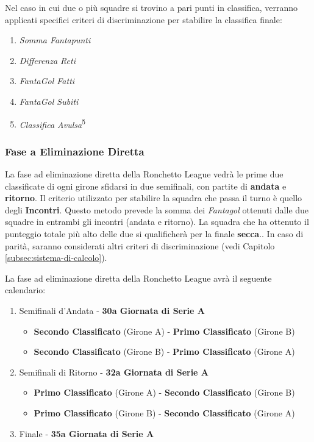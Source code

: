 \documentclass[12pt]{article}
\begin{document}
Nel caso in cui due o più squadre si trovino a pari punti in classifica, verranno applicati specifici criteri di discriminazione per stabilire la classifica finale:

\begin{enumerate}
    \item \textit{Somma Fantapunti}
    \item \textit{Differenza Reti}
    \item \textit{FantaGol Fatti}
    \item \textit{FantaGol Subiti}
    \item \textit{Classifica Avulsa}\textsuperscript{5}
\end{enumerate}

\subsubsection*{Fase a Eliminazione Diretta}
La fase ad eliminazione diretta della Ronchetto League vedrà le prime due classificate di ogni girone sfidarsi in due semifinali, con partite di \textbf{andata} e \textbf{ritorno}.
Il criterio utilizzato per stabilire la squadra che passa il turno è quello degli \textbf{Incontri}. Questo metodo prevede la somma dei \textit{Fantagol} ottenuti dalle due squadre in entrambi gli incontri (andata e ritorno). La squadra che ha ottenuto il punteggio totale più alto delle due si qualificherà per la finale \textbf{secca}.. In caso di parità, saranno considerati altri criteri di discriminazione (vedi Capitolo \ref{subsec:sistema-di-calcolo}).

La fase ad eliminazione diretta della Ronchetto League avrà il seguente calendario:
\begin{enumerate}
    \item Semifinali d'Andata - \textbf{30a Giornata di Serie A}
    \begin{itemize}
        \item \textbf{Secondo Classificato} (Girone A) - \textbf{Primo Classificato} (Girone B) 
        \item \textbf{Secondo Classificato} (Girone B) - \textbf{Primo Classificato} (Girone A) 
    \end{itemize}
    \item Semifinali di Ritorno - \textbf{32a Giornata di Serie A}
    \begin{itemize}
        \item \textbf{Primo Classificato} (Girone A) - \textbf{Secondo Classificato} (Girone B) 
        \item \textbf{Primo Classificato} (Girone B) - \textbf{Secondo Classificato} (Girone A) 
    \end{itemize}
    \item Finale - \textbf{35a Giornata di Serie A}
\end{enumerate}
\end{document}

